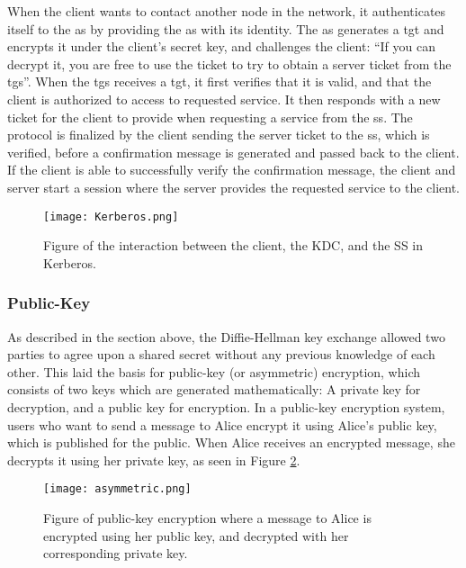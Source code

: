 When the client wants to contact another node in the network, it authenticates itself to the \gls{as} by providing the \gls{as} with its identity. The \gls{as} generates a \gls{tgt} and encrypts it under the client's secret key, and challenges the client: ``If you can decrypt it, you are free to use the ticket to try to obtain a server ticket from the \gls{tgs}''. When the \gls{tgs} receives a \gls{tgt}, it first verifies that it is valid, and that the client is authorized to access to requested service. It then responds with a new ticket for the client to provide when requesting a service from the \gls{ss}. The protocol is finalized by the client sending the server ticket to the \gls{ss}, which is verified, before a confirmation message is generated and passed back to the client. If the client is able to successfully verify the confirmation message, the client and server start a session where the server provides the requested service to the client.


\begin{figure}[h]
	\centering
	\texttt{[image: Kerberos.png]}
	\caption{Figure of the interaction between the client, the KDC, and the SS in Kerberos.}
	\label{fig:kerberos}
\end{figure}

\subsubsection{Public-Key}

As described in the section above, the Diffie-Hellman key exchange allowed two parties to agree upon a shared secret without any previous knowledge of each other. This laid the basis for public-key (or asymmetric) encryption, which consists of two keys which are generated mathematically: A private key for decryption, and a public key for encryption. In a public-key encryption system, users who want to send a message to Alice encrypt it using Alice's public key, which is published for the public. When Alice receives an encrypted message, she decrypts it using her private key, as seen in Figure \ref{fig:asymmetric}.


\begin{figure}[h]
	\centering
	\texttt{[image: asymmetric.png]}
	\caption{Figure of public-key encryption where a message to Alice is encrypted using her public key, and decrypted with her corresponding private key.}
	\label{fig:asymmetric}
\end{figure}

